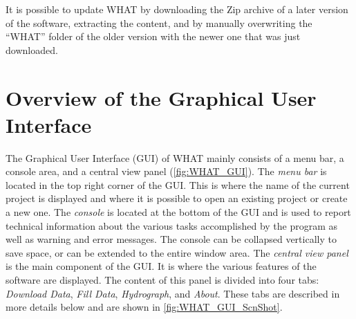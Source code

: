 \documentclass[WHATMANUAL.tex]{subfiles}
\begin{document}
It is possible to update WHAT by downloading the Zip archive of a later version of the software, extracting the content, and by manually overwriting the ``WHAT'' folder of the older version with the newer one that was just downloaded.

\newpage

\section{Overview of the Graphical User Interface}
\label{sec:GUI_overview}


The Graphical User Interface (GUI) of WHAT mainly consists of a menu bar, a console area, and a central view panel (\cref{fig:WHAT_GUI}). The \emph{menu bar} is located in the top right corner of the GUI. This is where the name of the current project is displayed and where it is possible to open an existing project or create a new one. The \emph{console} is located at the bottom of the GUI and is used to report technical information about the various tasks accomplished by the program as well as warning and error messages. The console can be collapsed vertically to save space, or can be extended to the entire window area. The \emph{central view panel} is the main component of the GUI. It is where the various features of the software are displayed. The content of this panel is divided into four tabs: \emph{Download Data}, \emph{Fill Data}, \emph{Hydrograph}, and \emph{About}. These tabs are described in more details below and are shown in \cref{fig:WHAT_GUI_ScnShot}.

\begin{figure}[!th]
    \setlength{\fboxsep}{0pt}
    {
    }
\end{figure}
\end{document}
